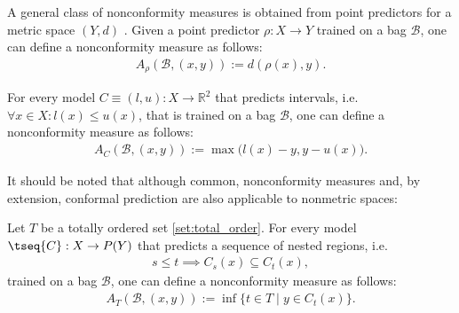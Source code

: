     \begin{example}
        A general class of nonconformity measures is obtained from point predictors for a metric space $(Y,d)$ . Given a point predictor $\rho:X\rightarrow Y$ trained on a bag $\mathcal{B}$, one can define a nonconformity measure as follows:
        \begin{gather}
            A_\rho(\mathcal{B},(x,y)) := d(\rho(x),y).
        \end{gather}
    \end{example}
    \begin{example}
        For every model $C\equiv(l,u):X\rightarrow\mathbb{R}^2$ that predicts intervals, i.e.~$\forall x\in X: l(x)\leq u(x)$, that is trained on a bag $\mathcal{B}$, one can define a nonconformity measure as follows:
        \begin{gather}
            A_C(\mathcal{B},(x,y)) := \max\Big(l(x)-y,y-u(x)\Big).
        \end{gather}
    \end{example}
    It should be noted that although common, nonconformity measures and, by extension, conformal prediction are also applicable to nonmetric spaces:
    \begin{example}
        Let $T$ be a totally ordered set \ref{set:total_order}. For every model $\tseq{C}:X\rightarrow P(Y)$ that predicts a sequence of nested regions, i.e.
        \begin{gather}
            s\leq t\implies C_s(x)\subseteq C_t(x),
        \end{gather}
        trained on a bag $\mathcal{B}$, one can define a nonconformity measure as follows:
        \begin{gather}
            A_T(\mathcal{B},(x,y)) := \inf\{t\in T\mid y\in C_t(x)\}.
        \end{gather}
    \end{example}

